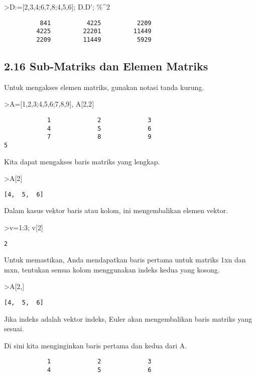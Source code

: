 \documentclass[
]{book}
\begin{document}
\textgreater D:={[}2,3,4;6,7,8;4,5,6{]}; D.D'; \%\^{}2

\begin{verbatim}
          841          4225          2209 
         4225         22201         11449 
         2209         11449          5929 
\end{verbatim}

\subsection{2.16 Sub-Matriks dan Elemen Matriks}\label{sub-matriks-dan-elemen-matriks}

Untuk mengakses elemen matriks, gunakan notasi tanda kurung.

\textgreater A={[}1,2,3;4,5,6;7,8,9{]}, A{[}2,2{]}

\begin{verbatim}
            1             2             3 
            4             5             6 
            7             8             9 
5
\end{verbatim}

Kita dapat mengakses baris matriks yang lengkap.

\textgreater A{[}2{]}

\begin{verbatim}
[4,  5,  6]
\end{verbatim}

Dalam kasus vektor baris atau kolom, ini mengembalikan elemen vektor.

\textgreater v=1:3; v{[}2{]}

\begin{verbatim}
2
\end{verbatim}

Untuk memastikan, Anda mendapatkan baris pertama untuk matriks 1xn dan mxn, tentukan semua kolom menggunakan indeks kedua yang kosong.

\textgreater A{[}2,{]}

\begin{verbatim}
[4,  5,  6]
\end{verbatim}

Jika indeks adalah vektor indeks, Euler akan mengembalikan baris matriks yang sesuai.

Di sini kita menginginkan baris pertama dan kedua dari A.

\begin{verbatim}
            1             2             3 
            4             5             6 
\end{verbatim}
\end{document}
